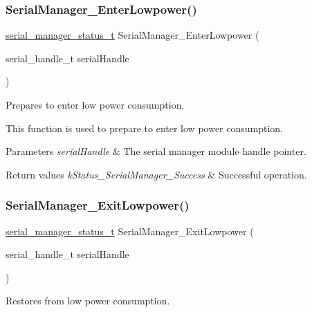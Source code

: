 \subsubsection{\texorpdfstring{SerialManager\_EnterLowpower()}{SerialManager\_EnterLowpower()}}
{\footnotesize\ttfamily \mbox{\hyperlink{group__serialmanager_gac1d9f848c57ca245ad9da8d049369da9}{serial\+\_\+manager\+\_\+status\+\_\+t}} Serial\+Manager\+\_\+\+Enter\+Lowpower (\begin{DoxyParamCaption}\item[{serial\+\_\+handle\+\_\+t}]{serial\+Handle }\end{DoxyParamCaption})}



Prepares to enter low power consumption. 

This function is used to prepare to enter low power consumption.


\begin{DoxyParams}{Parameters}
{\em serial\+Handle} & The serial manager module handle pointer. \\
\hline
\end{DoxyParams}

\begin{DoxyRetVals}{Return values}
{\em k\+Status\+\_\+\+Serial\+Manager\+\_\+\+Success} & Successful operation. \\
\hline
\end{DoxyRetVals}
\mbox{\label{group__serialmanager_gaef5c404d43871f6d8f761b27dbf183fa}} 
\subsubsection{\texorpdfstring{SerialManager\_ExitLowpower()}{SerialManager\_ExitLowpower()}}
{\footnotesize\ttfamily \mbox{\hyperlink{group__serialmanager_gac1d9f848c57ca245ad9da8d049369da9}{serial\+\_\+manager\+\_\+status\+\_\+t}} Serial\+Manager\+\_\+\+Exit\+Lowpower (\begin{DoxyParamCaption}\item[{serial\+\_\+handle\+\_\+t}]{serial\+Handle }\end{DoxyParamCaption})}



Restores from low power consumption. 

